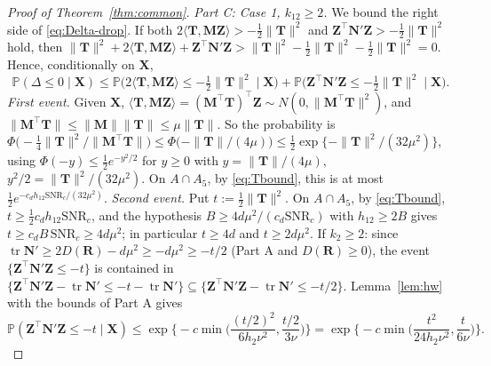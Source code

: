 \documentclass[11pt]{article}
\theoremstyle{definition}
\newcommand{\bX}{\mathbf{X}}
\newcommand{\bT}{\mathbf{T}}
\newcommand{\bZ}{\mathbf{Z}}
\newcommand{\bR}{\mathbf{R}}
\newcommand{\bM}{\mathbf{M}}
\newcommand{\bN}{\mathbf{N}}
\newcommand{\Prob}{\mathbb{P}}
\newcommand{\tr}{\operatorname{tr}}
\begin{document}
\begin{proof}[Proof of Theorem~\ref{thm:common}]
\emph{Part C: Case 1, $k_{12}\ge2$.} We bound the right side of \eqref{eq:Delta-drop}. If both $2\langle\bT,\bM\bZ\rangle>-\tfrac12\|\bT\|^2$ and $\bZ^\top\bN'\bZ>-\tfrac12\|\bT\|^2$ hold, then $\|\bT\|^2+2\langle\bT,\bM\bZ\rangle+\bZ^\top\bN'\bZ>\|\bT\|^2-\tfrac12\|\bT\|^2-\tfrac12\|\bT\|^2=0$. Hence, conditionally on $\bX$,
\begin{equation}\label{eq:two-events}
\Prob(\Delta\le0\mid\bX)\le\Prob\big(2\langle\bT,\bM\bZ\rangle\le-\tfrac12\|\bT\|^2\mid\bX\big)+\Prob\big(\bZ^\top\bN'\bZ\le-\tfrac12\|\bT\|^2\mid\bX\big).
\end{equation}
\emph{First event.} Given $\bX$, $\langle\bT,\bM\bZ\rangle=(\bM^\top\bT)^\top\bZ\sim N(0,\|\bM^\top\bT\|^2)$, and $\|\bM^\top\bT\|\le\|\bM\|\|\bT\|\le\mu\|\bT\|$. So the probability is $\Phi\big(-\tfrac14\|\bT\|^2/\|\bM^\top\bT\|\big)\le\Phi\big(-\|\bT\|/(4\mu)\big)\le\tfrac12\exp\{-\|\bT\|^2/(32\mu^2)\}$, using $\Phi(-y)\le\tfrac12e^{-y^2/2}$ for $y\ge0$ with $y=\|\bT\|/(4\mu)$, $y^2/2=\|\bT\|^2/(32\mu^2)$. On $A\cap A_5$, by \eqref{eq:Tbound}, this is at most $\tfrac12e^{-c_dh_{12}\mathrm{SNR}_c/(32\mu^2)}$.
\emph{Second event.} Put $t:=\tfrac12\|\bT\|^2$. On $A\cap A_5$, by \eqref{eq:Tbound}, $t\ge\tfrac12c_dh_{12}\mathrm{SNR}_c$, and the hypothesis $B\ge4d\mu^2/(c_d\mathrm{SNR}_c)$ with $h_{12}\ge2B$ gives $t\ge c_dB\,\mathrm{SNR}_c\ge4d\mu^2$; in particular $t\ge4d$ and $t\ge2d\mu^2$. If $k_2\ge2$: since $\tr\bN'\ge2D(\bR)-d\mu^2\ge-d\mu^2\ge-t/2$ (Part A and $D(\bR)\ge0$), the event $\{\bZ^\top\bN'\bZ\le-t\}$ is contained in $\{\bZ^\top\bN'\bZ-\tr\bN'\le-t-\tr\bN'\}\subseteq\{\bZ^\top\bN'\bZ-\tr\bN'\le-t/2\}$. Lemma~\ref{lem:hw} with the bounds of Part A gives
\[
\Prob(\bZ^\top\bN'\bZ\le-t\mid\bX)\le\exp\Big\{-c\min\Big(\frac{(t/2)^2}{6h_2\nu^2},\frac{t/2}{3\nu}\Big)\Big\}=\exp\Big\{-c\min\Big(\frac{t^2}{24h_2\nu^2},\frac{t}{6\nu}\Big)\Big\}.
\]

\end{proof}
\end{document}
